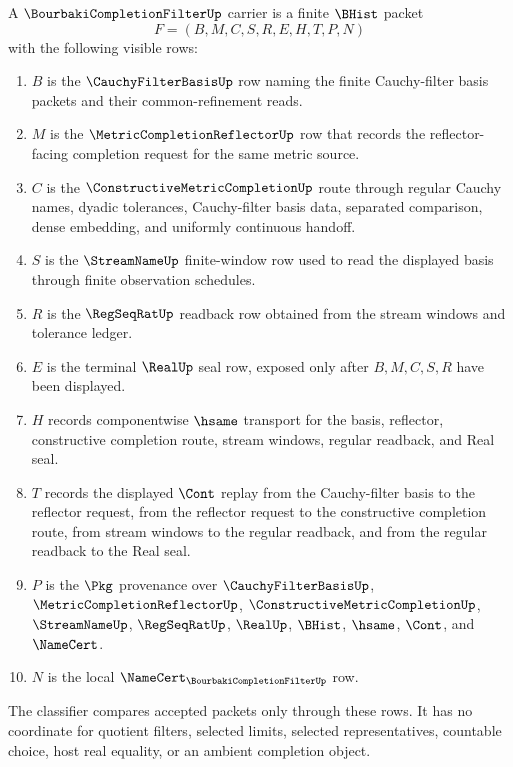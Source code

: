 \begin{definition}
\label{def:bourbaki-completion-filter-carrier}
A $\BourbakiCompletionFilterUp$ carrier is a finite $\BHist$ packet
$$
F=(B,M,C,S,R,E,H,T,P,N)
$$
with the following visible rows:
\begin{enumerate}
\item $B$ is the $\CauchyFilterBasisUp$ row naming the finite Cauchy-filter basis packets and their common-refinement reads.
\item $M$ is the $\MetricCompletionReflectorUp$ row that records the reflector-facing completion request for the same metric source.
\item $C$ is the $\ConstructiveMetricCompletionUp$ route through regular Cauchy names, dyadic tolerances, Cauchy-filter basis data, separated comparison, dense embedding, and uniformly continuous handoff.
\item $S$ is the $\StreamNameUp$ finite-window row used to read the displayed basis through finite observation schedules.
\item $R$ is the $\RegSeqRatUp$ readback row obtained from the stream windows and tolerance ledger.
\item $E$ is the terminal $\RealUp$ seal row, exposed only after $B,M,C,S,R$ have been displayed.
\item $H$ records componentwise $\hsame$ transport for the basis, reflector, constructive completion route, stream windows, regular readback, and Real seal.
\item $T$ records the displayed $\Cont$ replay from the Cauchy-filter basis to the reflector request, from the reflector request to the constructive completion route, from stream windows to the regular readback, and from the regular readback to the Real seal.
\item $P$ is the $\Pkg$ provenance over $\CauchyFilterBasisUp$, $\MetricCompletionReflectorUp$, $\ConstructiveMetricCompletionUp$, $\StreamNameUp$, $\RegSeqRatUp$, $\RealUp$, $\BHist$, $\hsame$, $\Cont$, and $\NameCert$.
\item $N$ is the local $\NameCert_{\BourbakiCompletionFilterUp}$ row.
\end{enumerate}
The classifier compares accepted packets only through these rows. It has no coordinate for quotient filters, selected limits, selected representatives, countable choice, host real equality, or an ambient completion object.
\end{definition}

